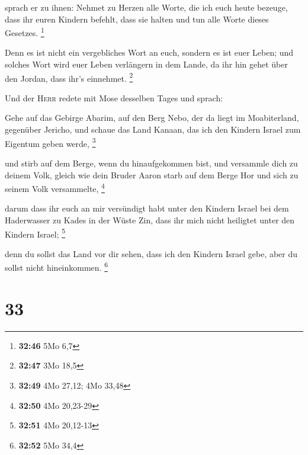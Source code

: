  sprach er zu ihnen: Nehmet zu Herzen alle Worte, die ich
euch heute bezeuge, dass ihr euren Kindern befehlt, dass sie halten und
tun alle Worte dieses Gesetzes. \footnote{\textbf{32:46} 5Mo 6,7}

 Denn es ist nicht ein vergebliches Wort an euch, sondern
es ist euer Leben; und solches Wort wird euer Leben verlängern in dem
Lande, da ihr hin gehet über den Jordan, dass ihr's einnehmet.
\footnote{\textbf{32:47} 3Mo 18,5}

 Und der \textsc{Herr} redete mit Mose desselben Tages
und sprach:

 Gehe auf das Gebirge Abarim, auf den Berg Nebo, der da
liegt im Moabiterland, gegenüber Jericho, und schaue das Land Kanaan,
das ich den Kindern Israel zum Eigentum geben werde, \footnote{\textbf{32:49}
  4Mo 27,12; 4Mo 33,48}

 und stirb auf dem Berge, wenn du hinaufgekommen bist,
und versammle dich zu deinem Volk, gleich wie dein Bruder Aaron starb
auf dem Berge Hor und sich zu seinem Volk versammelte, \footnote{\textbf{32:50}
  4Mo 20,23-29}

 darum dass ihr euch an mir versündigt habt unter den
Kindern Israel bei dem Haderwasser zu Kades in der Wüste Zin, dass ihr
mich nicht heiligtet unter den Kindern Israel; \footnote{\textbf{32:51}
  4Mo 20,12-13}

 denn du sollst das Land vor dir sehen, dass ich den
Kindern Israel gebe, aber du sollst nicht hineinkommen. \footnote{\textbf{32:52}
  5Mo 34,4}

\hypertarget{section-32}{%
\section{33}\label{section-32}}

